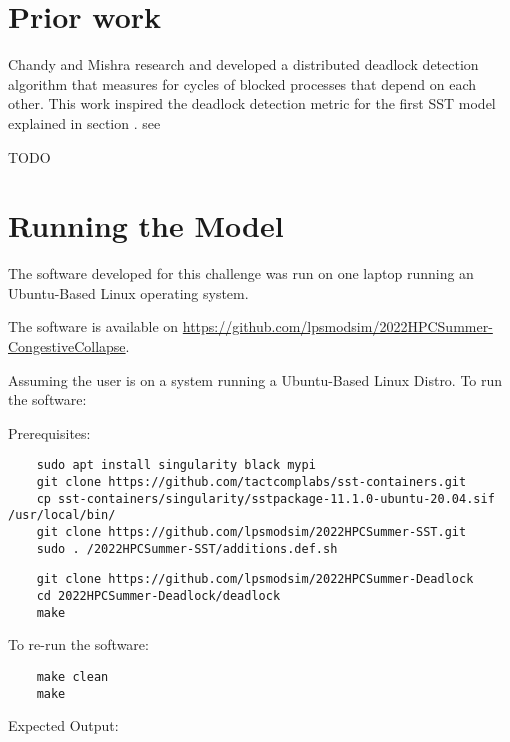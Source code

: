 \documentclass{article}
\begin{document}
\section{Prior work} %

Chandy and Mishra \cite{1983_Chandy} research and developed a distributed deadlock detection algorithm that measures for cycles of blocked processes that depend on each other. This work inspired the deadlock detection metric for the first SST model explained in section .
see %

TODO

\section{Running the Model}

The software developed for this challenge was run on one laptop running an Ubuntu-Based Linux operating system.

\noindent The software is available on \href{https://github.com/lpsmodsim/2022HPCSummer-CongestiveCollapse}{https://github.com/lpsmodsim/2022HPCSummer-CongestiveCollapse}.\newline

\noindent Assuming the user is on a system running a Ubuntu-Based Linux Distro. To run the software:\newline

\noindent Prerequisites: 

\begin{verbatim}
	sudo apt install singularity black mypi
	git clone https://github.com/tactcomplabs/sst-containers.git
	cp sst-containers/singularity/sstpackage-11.1.0-ubuntu-20.04.sif /usr/local/bin/
	git clone https://github.com/lpsmodsim/2022HPCSummer-SST.git
	sudo . /2022HPCSummer-SST/additions.def.sh
\end{verbatim}

\begin{verbatim}
	git clone https://github.com/lpsmodsim/2022HPCSummer-Deadlock
	cd 2022HPCSummer-Deadlock/deadlock
	make
\end{verbatim}

\noindent To re-run the software:

\begin{verbatim}
	make clean
	make
\end{verbatim}

\noindent Expected Output:
\end{document}
